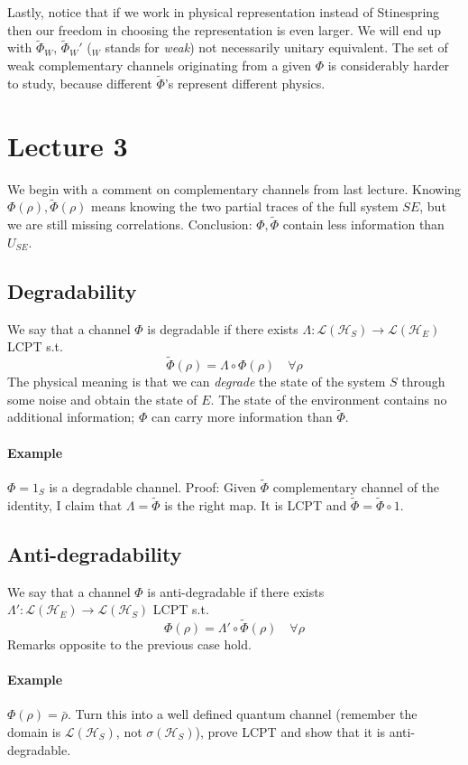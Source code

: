 \documentclass[a4paper, 11pt]{article}
\newcommand{\HH}{\mathcal{H}}
\begin{document}
	Lastly, notice that if we work in physical representation instead of Stinespring then our freedom in choosing the representation is even larger.
	We will end up with $\tilde{\Phi}_W$, $\tilde{\Phi}_W'$ ($_W$ stands for \emph{weak}) not necessarily unitary equivalent. The set of weak complementary channels originating from a given $\Phi$ is considerably harder to study, because different $\tilde{\Phi}$'s represent different physics.
	
	\section{Lecture 3}
	We begin with a comment on complementary channels from last lecture. Knowing $\Phi(\rho),\tilde{\Phi}(\rho)$ means knowing the two partial traces of the full system $SE$, but we are still missing correlations. Conclusion: $\Phi,\tilde{\Phi}$ contain less information than $U_{SE}$.
	
	\subsection{Degradability}
	We say that a channel $\Phi$ is degradable if there exists $\Lambda:\mathcal{L}(\HH_S)\rightarrow\mathcal{L}(\HH_E)$ LCPT s.t.
	\[ \tilde{\Phi}(\rho) = \Lambda \circ \Phi(\rho) \quad \forall \rho \]
	The physical meaning is that we can \emph{degrade} the state of the system $S$ through some noise and obtain the state of $E$. The state of the environment contains no additional information; $\Phi$ can carry more information than $\tilde{\Phi}$.
	
	\paragraph{Example} $\Phi = 1_S$ is a degradable channel. Proof: Given $\tilde{\Phi}$ complementary channel of the identity, I claim that $\Lambda = \tilde{\Phi}$ is the right map. It is LCPT and $\tilde{\Phi} = \tilde{\Phi} \circ 1$.
	
	\subsection{Anti-degradability}
	We say that a channel $\Phi$ is anti-degradable if there exists $\Lambda':\mathcal{L}(\HH_E)\rightarrow\mathcal{L}(\HH_S)$ LCPT s.t.
	\[ {\Phi}(\rho) = \Lambda' \circ \tilde{\Phi}(\rho) \quad \forall \rho \]
	Remarks opposite to the previous case hold.
	
	\paragraph{Example} $\Phi(\rho) = \bar{\rho}$. Turn this into a well defined quantum channel (remember the domain is $\mathcal{L}(\HH_S)$, not $\sigma(\HH_S)$), prove LCPT and show that it is anti-degradable.
	
\end{document}
